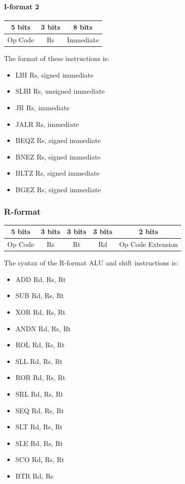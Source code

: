 \documentclass[11pt]{article}
\begin{document}
\paragraph{I-format 2}
\begin{center}
\begin{tabular}{|c|c|c|}
\hline
5 bits & 3 bits & 8 bits \\
\hline
\hline
Op Code & Rs & Immediate \\
\hline
\hline
\end{tabular}
\end{center}

The format of these instructions is:
\begin{itemize}
\item LBI Rs, signed immediate
\item SLBI Rs, unsigned immediate
\item JR Rs, immediate
\item JALR Rs, immediate
\item BEQZ Rs, signed immediate
\item BNEZ Rs, signed immediate
\item BLTZ Rs, signed immediate
\item BGEZ Rs, signed immediate
\end{itemize}

\subsubsection{R-format}
\begin{center}
\begin{tabular}{|c|c|c|c|c|}
\hline
5 bits & 3 bits & 3 bits & 3 bits & 2 bits \\
\hline
\hline
Op Code & Rs & Rt & Rd & Op Code Extension \\
\hline
\hline
\end{tabular}
\end{center}

The syntax of the R-format ALU and shift instructions is:
\begin{itemize}
\item ADD Rd, Rs, Rt
\item SUB Rd, Rs, Rt
\item XOR Rd, Rs, Rt
\item ANDN Rd, Rs, Rt
\item ROL Rd, Rs, Rt
\item SLL Rd, Rs, Rt
\item ROR Rd, Rs, Rt
\item SRL Rd, Rs, Rt
\item SEQ Rd, Rs, Rt
\item SLT Rd, Rs, Rt
\item SLE Rd, Rs, Rt
\item SCO Rd, Rs, Rt
\item BTR Rd, Rs
\end{itemize}
\end{document}
